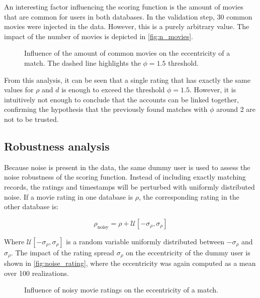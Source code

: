 An interesting factor influencing the scoring function is the amount of movies that are common for users in both databases. In the validation step, 30 common movies were injected in the data. However, this is a purely arbitrary value. The impact of the number of movies is depicted in \autoref{fig:n_movies}.

\begin{figure}[h]
	\centering
	
	\caption{Influence of the amount of common movies on the eccentricity of a match. The dashed line highlights the $\phi = 1.5$ threshold.}
	\label{fig:n_movies}
\end{figure}

From this analysis, it can be seen that a single rating that has exactly the same values for $\rho$ and $d$ is enough to exceed the threshold $\phi = 1.5$. However, it is intuitively not enough to conclude that the accounts can be linked together, confirming the hypothesis that the previously found matches with $\phi$ around 2 are not to be trusted.

\subsection{Robustness analysis}

Because noise is present in the data, the same dummy user is used to assess the noise robustness of the scoring function. Instead of including exactly matching records, the ratings and timestamps will be perturbed with uniformly distributed noise. If a movie rating in one database is $\rho$, the corresponding rating in the other database is:

\begin{equation}
	\rho_{\text{noisy}} = \rho + \mathcal{U}\left[-\sigma_{\rho}, \sigma_{\rho}\right]
\end{equation}

Where $\mathcal{U}\left[-\sigma_{\rho}, \sigma_{\rho}\right]$ is a random variable uniformly distributed between $-\sigma_{\rho}$ and $\sigma_{\rho}$. The impact of the rating spread $\sigma_{\rho}$ on the eccentricity of the dummy user is shown in \autoref{fig:noise_rating}, where the eccentricity was again computed as a mean over 100 realizations.

\begin{figure}[h]
	\centering
	
	\caption{Influence of noisy movie ratings on the eccentricity of a match.}
	\label{fig:noise_rating}
\end{figure}

